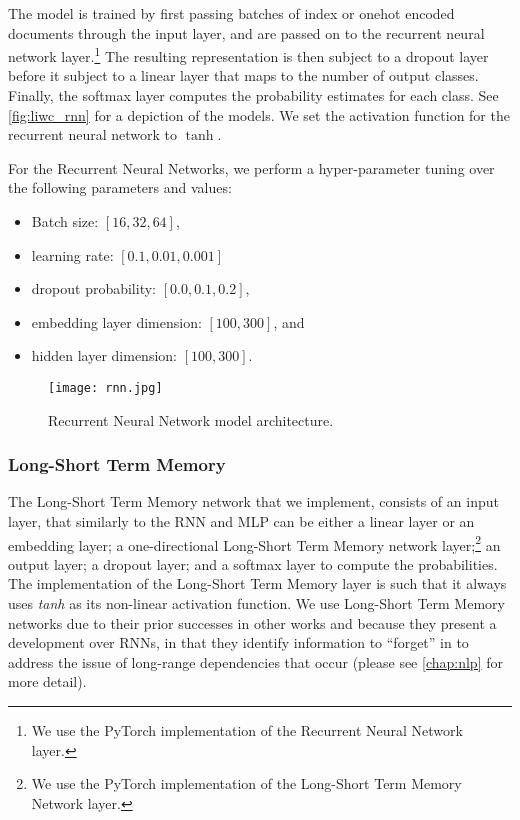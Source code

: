 The model is trained by first passing batches of index or onehot encoded documents through the input layer, and are passed on to the recurrent neural network layer.\footnote{We use the PyTorch implementation of the Recurrent Neural Network layer.} The resulting representation is then subject to a dropout layer before it subject to a linear layer that maps to the number of output classes. Finally, the softmax layer computes the probability estimates for each class. See \autoref{fig:liwc_rnn} for a depiction of the models. We set the activation function for the recurrent neural network to $\tanh$.

For the Recurrent Neural Networks, we perform a hyper-parameter tuning over the following parameters and values:

\begin{itemize}
  \item Batch size: $[16, 32, 64]$,
  \item learning rate: $[0.1, 0.01, 0.001]$
  \item dropout probability: $[0.0, 0.1, 0.2]$,
  \item embedding layer dimension: $[100, 300]$, and
  \item hidden layer dimension: $[100, 300]$.
\end{itemize}

\begin{figure}
  \centering
  \texttt{[image: rnn.jpg]}
  \caption{Recurrent Neural Network model architecture.}
  \label{fig:liwc_rnn}
\end{figure}

\subsubsection{Long-Short Term Memory}

The Long-Short Term Memory network that we implement, consists of an input layer, that similarly to the RNN and MLP can be either a linear layer or an embedding layer; a one-directional Long-Short Term Memory network layer;\footnote{We use the PyTorch implementation of the Long-Short Term Memory Network layer.} an output layer; a dropout layer; and a softmax layer to compute the probabilities. The implementation of the Long-Short Term Memory layer is such that it always uses \textit{tanh} as its non-linear activation function. We use Long-Short Term Memory networks due to their prior successes in other works \cite{CITE: LSTM papers} and because they present a development over RNNs, in that they identify information to ``forget'' in to address the issue of long-range dependencies that occur (please see \autoref{chap:nlp} for more detail).

